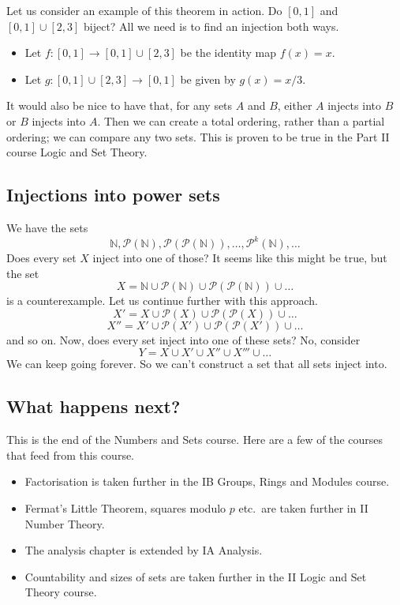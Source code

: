 Let us consider an example of this theorem in action.
Do \([0, 1]\) and \([0,1]\cup[2,3]\) biject?
All we need is to find an injection both ways.
\begin{itemize}
	\item Let \(f\colon [0,1] \to [0,1] \cup [2,3]\) be the identity map \(f(x) = x\).
	\item Let \(g\colon [0,1] \cup [2,3] \to [0,1]\) be given by \(g(x) = x/3\).
\end{itemize}

It would also be nice to have that, for any sets \(A\) and \(B\), either \(A\) injects into \(B\) or \(B\) injects into \(A\).
Then we can create a total ordering, rather than a partial ordering; we can compare any two sets.
This is proven to be true in the Part II course Logic and Set Theory.

\subsection{Injections into power sets}
We have the sets
\[
	\mathbb N, \mathcal P(\mathbb N), \mathcal P(\mathcal P(\mathbb N)), \dots, \mathcal P^k(\mathbb N), \dots
\]
Does every set \(X\) inject into one of those?
It seems like this might be true, but the set
\[
	X = \mathbb N \cup \mathcal P(\mathbb N) \cup \mathcal P(\mathcal P(\mathbb N)) \cup \dots
\]
is a counterexample.
Let us continue further with this approach.
\[
	X' = X \cup \mathcal P(X) \cup \mathcal P(\mathcal P(X)) \cup \dots
\]
\[
	X'' = X' \cup \mathcal P(X') \cup \mathcal P(\mathcal P(X')) \cup \dots
\]
and so on.
Now, does every set inject into one of these sets?
No, consider
\[
	Y = X \cup X' \cup X'' \cup X''' \cup \dots
\]
We can keep going forever.
So we can't construct a set that all sets inject into.

\subsection{What happens next?}
This is the end of the Numbers and Sets course.
Here are a few of the courses that feed from this course.
\begin{itemize}
	\item Factorisation is taken further in the IB Groups, Rings and Modules course.
	\item Fermat's Little Theorem, squares modulo \(p\) etc.\ are taken further in II Number Theory.
	\item The analysis chapter is extended by IA Analysis.
	\item Countability and sizes of sets are taken further in the II Logic and Set Theory course.
\end{itemize}
